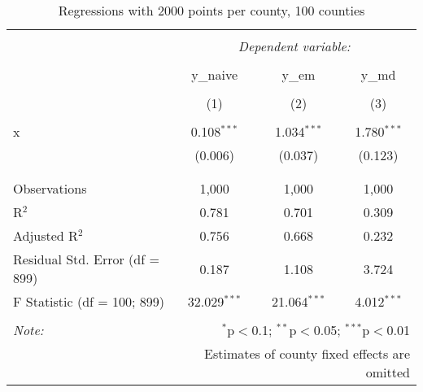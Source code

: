 
\begin{table}[!htbp] \centering 
  \caption{Regressions with 2000 points per county, 100 counties} 
  \label{} 
\begin{tabular}{@{\extracolsep{5pt}}lccc} 
\\[-1.8ex]\hline 
\hline \\[-1.8ex] 
 & \multicolumn{3}{c}{\textit{Dependent variable:}} \\ 
\cline{2-4} 
\\[-1.8ex] & y\_naive & y\_em & y\_md \\ 
\\[-1.8ex] & (1) & (2) & (3)\\ 
\hline \\[-1.8ex] 
 x & 0.108$^{***}$ & 1.034$^{***}$ & 1.780$^{***}$ \\ 
  & (0.006) & (0.037) & (0.123) \\ 
  & & & \\ 
\hline \\[-1.8ex] 
Observations & 1,000 & 1,000 & 1,000 \\ 
R$^{2}$ & 0.781 & 0.701 & 0.309 \\ 
Adjusted R$^{2}$ & 0.756 & 0.668 & 0.232 \\ 
Residual Std. Error (df = 899) & 0.187 & 1.108 & 3.724 \\ 
F Statistic (df = 100; 899) & 32.029$^{***}$ & 21.064$^{***}$ & 4.012$^{***}$ \\ 
\hline 
\hline \\[-1.8ex] 
\textit{Note:}  & \multicolumn{3}{r}{$^{*}$p$<$0.1; $^{**}$p$<$0.05; $^{***}$p$<$0.01} \\ 
 & \multicolumn{3}{r}{Estimates of county fixed effects are omitted} \\ 
\end{tabular} 
\end{table} 
